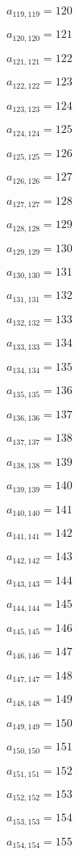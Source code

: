 \documentclass[a4paper,12pt]{article}
\begin{document}
$a _{ 119, 119 } = 120$

$a _{ 120, 120 } = 121$

$a _{ 121, 121 } = 122$

$a _{ 122, 122 } = 123$

$a _{ 123, 123 } = 124$

$a _{ 124, 124 } = 125$

$a _{ 125, 125 } = 126$

$a _{ 126, 126 } = 127$

$a _{ 127, 127 } = 128$

$a _{ 128, 128 } = 129$

$a _{ 129, 129 } = 130$

$a _{ 130, 130 } = 131$

$a _{ 131, 131 } = 132$

$a _{ 132, 132 } = 133$

$a _{ 133, 133 } = 134$

$a _{ 134, 134 } = 135$

$a _{ 135, 135 } = 136$

$a _{ 136, 136 } = 137$

$a _{ 137, 137 } = 138$

$a _{ 138, 138 } = 139$

$a _{ 139, 139 } = 140$

$a _{ 140, 140 } = 141$

$a _{ 141, 141 } = 142$

$a _{ 142, 142 } = 143$

$a _{ 143, 143 } = 144$

$a _{ 144, 144 } = 145$

$a _{ 145, 145 } = 146$

$a _{ 146, 146 } = 147$

$a _{ 147, 147 } = 148$

$a _{ 148, 148 } = 149$

$a _{ 149, 149 } = 150$

$a _{ 150, 150 } = 151$

$a _{ 151, 151 } = 152$

$a _{ 152, 152 } = 153$

$a _{ 153, 153 } = 154$

$a _{ 154, 154 } = 155$
\end{document}

